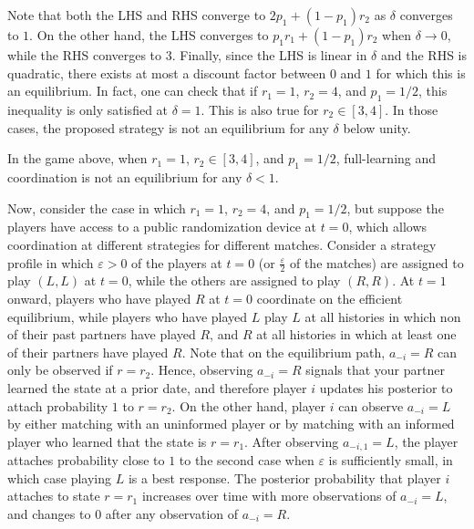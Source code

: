 \documentclass[12pt,letterpaper]{article}
\newtheorem{proposition}{\hskip\parindent\bf{Proposition}}
\newtheorem{lemma}{\hskip\parindent\bf{Lemma}}
\begin{document}
Note that both the LHS and RHS converge to $2p_1+(1-p_1)r_2$ as $\delta$ converges to $1$. On the other hand, the LHS converges to $p_1r_1+(1-p_1)r_2$ when $\delta \to 0$, while the RHS converges to $3$. Finally, since the LHS is linear in $\delta$ and the RHS is quadratic, there exists at most a discount factor between $0$ and $1$ for which this is an equilibrium. In fact, one can check that if $r_1=1$, $r_2=4$, and $p_1=1/2$, this inequality is only satisfied at $\delta=1$. This is also true for $r_2\in[3,4]$. In those cases, the proposed strategy is not an equilibrium for any $\delta$ below unity.

\begin{lemma}
    In the game above, when $r_1=1$, $r_2\in[3,4]$, and $p_1=1/2$, full-learning and coordination is not an equilibrium for any $\delta<1$.
\end{lemma}

Now, consider the case in which $r_1=1$, $r_2=4$, and $p_1=1/2$, but suppose the players have access to a public randomization device at $t=0$, which allows coordination at different strategies for different matches. Consider a strategy profile in which $\varepsilon>0$ of the players at $t=0$ (or $\frac{\varepsilon}{2}$ of the matches) are assigned to play $(L,L)$ at $t=0$, while the others are assigned to play $(R,R)$. At $t=1$ onward, players who have played $R$ at $t=0$ coordinate on the efficient equilibrium, while players who have played $L$ play $L$ at all histories in which non of their past partners have played $R$, and $R$ at all histories in which at least one of their partners have played $R$. Note that on the equilibrium path, $a_{-i}=R$ can only be observed if $r=r_2$. Hence, observing $a_{-i}=R$ signals that your partner learned the state at a prior date, and therefore player $i$ updates his posterior to attach probability $1$ to $r=r_2$. On the other hand, player $i$ can observe $a_{-i}=L$ by either matching with an uninformed player or by matching with an informed player who learned that the state is $r=r_1$. After observing $a_{-i,1}=L$, the player attaches probability close to $1$ to the second case when $\varepsilon$ is sufficiently small, in which case playing $L$ is a best response. The posterior probability that player $i$ attaches to state $r=r_1$ increases over time with more observations of $a_{-i}=L$, and changes to $0$ after any observation of $a_{-i}=R$.





\end{document}
